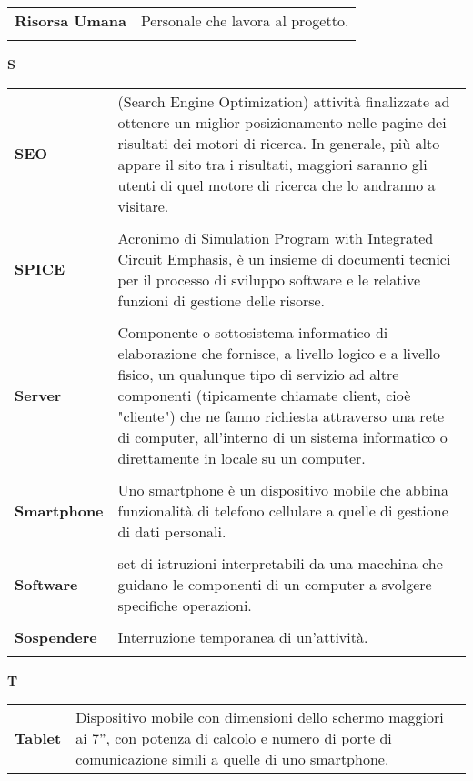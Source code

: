 {\begin{longtable}{L{4cm} p{10cm}}
\textbf{Risorsa Umana} & Personale che lavora al progetto. \\ 
 \\ 
\end{longtable} 
\newpage 
{} 
{} 
\hfill\Huge{\textbf{S}} \\ 
\normalsize 
\begin{longtable}{L{4cm} p{10cm}}
\textbf{SEO} & (Search Engine Optimization) attività finalizzate ad ottenere un miglior posizionamento nelle pagine dei risultati dei motori di ricerca. In generale, più alto appare il sito tra i risultati, maggiori saranno gli utenti di quel motore di ricerca che lo andranno a visitare. \\ 
 \\ 
\textbf{SPICE} & Acronimo di Simulation Program with Integrated Circuit Emphasis, è un insieme di documenti tecnici per il processo di sviluppo software e le relative funzioni di gestione delle risorse. \\ 
 \\ 
\textbf{Server} & Componente o sottosistema informatico di elaborazione che fornisce, a livello logico e a livello fisico, un qualunque tipo di servizio ad altre componenti (tipicamente chiamate client, cioè "cliente") che ne fanno richiesta attraverso una rete di computer, all'interno di un sistema informatico o direttamente in locale su un computer. \\ 
 \\ 
\textbf{Smartphone} & Uno smartphone è un dispositivo mobile che abbina funzionalità di telefono cellulare a quelle di gestione di dati personali. \\ 
 \\ 
\textbf{Software} & set di istruzioni interpretabili da una macchina che guidano le componenti di un computer a svolgere specifiche operazioni. \\ 
 \\ 
\textbf{Sospendere} & Interruzione temporanea di un’attività. \\ 
 \\ 
\end{longtable} 
\newpage 
{} 
{} 
\hfill\Huge{\textbf{T}} \\ 
\normalsize 
\begin{longtable}{L{4cm} p{10cm}}
\textbf{Tablet} & Dispositivo mobile con dimensioni dello schermo maggiori ai 7”, con potenza di calcolo e numero di porte di comunicazione simili a quelle di uno smartphone. \\ 

\end{longtable}}
